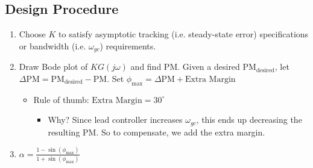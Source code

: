 \subsection{Design Procedure}
\begin{process}
    \begin{enumerate}
        \item Choose $K$ to satisfy asymptotic tracking (i.e. steady-state error) specifications or bandwidth (i.e. $\omega_{gc}$) requirements.
        \item Draw Bode plot of $K G(j \omega)$ and find PM. Given a desired $\text{PM}_{\text{desired}}$, let $\Delta \text{PM} = \text{PM}_{\text{desired}} - \text{PM}$. Set $\phi_{\max} = \Delta \text{PM} + \text{Extra Margin}$
        \begin{itemize}
            \item Rule of thumb: $\text{Extra Margin} = 30^\circ$
            \begin{itemize}
                \item Why? Since lead controller increases $\omega_{gc}$, this ends up decreasing the resulting PM. So to compensate, we add the extra margin. 
            \end{itemize}
        \end{itemize}
        \item $\alpha = \frac{1 - \sin(\phi_{\max})}{1 + \sin(\phi_{\max})}$
    \end{enumerate}
\end{process}


